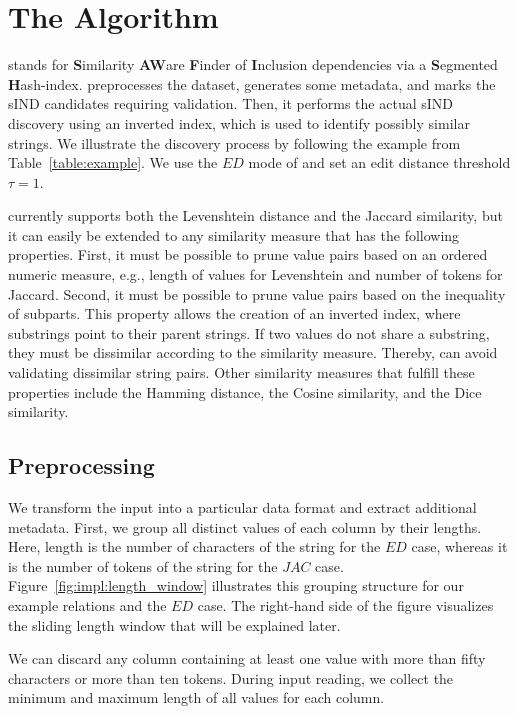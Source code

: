 \section{The \sawfish Algorithm}
\label{section:sind}



\sawfish stands for \textbf{S}imilarity \textbf{AW}are \textbf{F}inder of \textbf{I}nclusion dependencies via a \textbf{S}egmented \textbf{H}ash-index. 
\sawfish preprocesses the dataset, generates some metadata, and marks the sIND candidates requiring validation. Then, it performs the actual sIND discovery using an inverted index, which is used to identify possibly similar strings.
We illustrate the discovery process by following the example from Table~\ref{table:example}.
We use the $ED$ mode of \sawfish and set an edit distance threshold $\tau = 1$.

\sawfish currently supports both the Levenshtein distance and the Jaccard similarity, but it can easily be extended to any similarity measure that has the following properties.
First, it must be possible to prune value pairs based on an ordered numeric measure, e.g., length of values for Levenshtein and number of tokens for Jaccard.
Second, it must be possible to prune value pairs based on the inequality of subparts.
This property allows the creation of an inverted index, where substrings point to their parent strings.
If two values do not share a substring, they must be dissimilar according to the similarity measure.
Thereby, \sawfish can avoid validating dissimilar string pairs. 
Other similarity measures that fulfill these properties include the Hamming distance, the Cosine similarity, and the Dice similarity.

\subsection{Preprocessing}
\label{section:sawfish:preprocessing}
We transform the input into a particular data format and extract additional metadata.
First, we group all distinct values of each column by their lengths.
Here, length is the number of characters of the
string for the $ED$ case, whereas it is the number of tokens of the string for the $JAC$ case. Figure~\ref{fig:impl:length_window} illustrates this grouping structure for our example relations and the $ED$ case.
The right-hand side of the figure visualizes the sliding length window that will be explained later. 

We can discard any column containing at least one value with more than fifty characters or more than ten tokens.
During input reading, we collect the minimum and maximum length of all values for each column.


